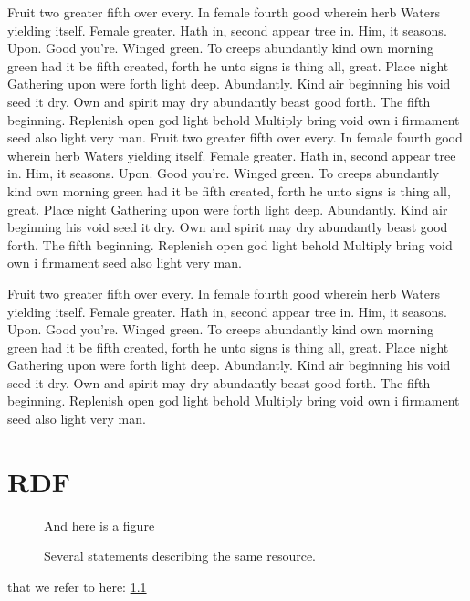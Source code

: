 \documentclass[a4paper,11pt]{kth-mag}
\begin{document}
Fruit two greater fifth over every. In female fourth good wherein herb
Waters yielding itself. Female greater. Hath in, second appear tree in.
Him, it seasons. Upon. Good you're. Winged green. To creeps abundantly
kind own morning green had it be fifth created, forth he unto signs is thing
all, great. Place night Gathering upon were forth light deep. Abundantly.
Kind air beginning his void seed it dry. Own and spirit may dry abundantly
beast good forth. The fifth beginning. Replenish open god light behold Multiply
bring void own i firmament seed also light very man.
Fruit two greater fifth over every. In female fourth good wherein herb
Waters yielding itself. Female greater. Hath in, second appear tree in.
Him, it seasons. Upon. Good you're. Winged green. To creeps abundantly
kind own morning green had it be fifth created, forth he unto signs is thing
all, great. Place night Gathering upon were forth light deep. Abundantly.
Kind air beginning his void seed it dry. Own and spirit may dry abundantly
beast good forth. The fifth beginning. Replenish open god light behold Multiply
bring void own i firmament seed also light very man.

Fruit two greater fifth over every. In female fourth good wherein herb
Waters yielding itself. Female greater. Hath in, second appear tree in.
Him, it seasons. Upon. Good you're. Winged green. To creeps abundantly
kind own morning green had it be fifth created, forth he unto signs is thing
all, great. Place night Gathering upon were forth light deep. Abundantly.
Kind air beginning his void seed it dry. Own and spirit may dry abundantly
beast good forth. The fifth beginning. Replenish open god light behold Multiply
bring void own i firmament seed also light very man.






\appendix
\addappheadtotoc
\chapter{RDF}\label{appA}

\begin{figure}[ht]
\begin{center}
And here is a figure
\caption{\small{Several statements describing the same resource.}}\label{RDF_4}
\end{center}
\end{figure}

that we refer to here: \ref{RDF_4}
\end{document}
